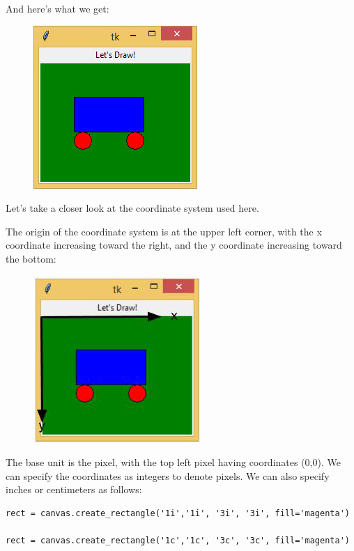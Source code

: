 \documentclass{article}
\begin{document}
And here's what we get:
\begin{figure}[h]
\includegraphics[scale=.6]{letsdraw}\\
\end{figure}


Let's take a closer look at the coordinate system used here.

The origin of the coordinate system is at the upper left corner, with the x coordinate increasing toward the right, and the y  coordinate increasing toward the bottom:

\begin{figure}[h]
\includegraphics[scale=.6]{coordinates}\\
\end{figure}

The base unit is the pixel, with the top left pixel having coordinates (0,0). We can specify the coordinates as integers to denote pixels.  We  can also specify inches or centimeters as follows:

\begin{lstlisting}
rect = canvas.create_rectangle('1i','1i', '3i', '3i', fill='magenta')

rect = canvas.create_rectangle('1c','1c', '3c', '3c', fill='magenta')
\end{lstlisting}
\end{document}
